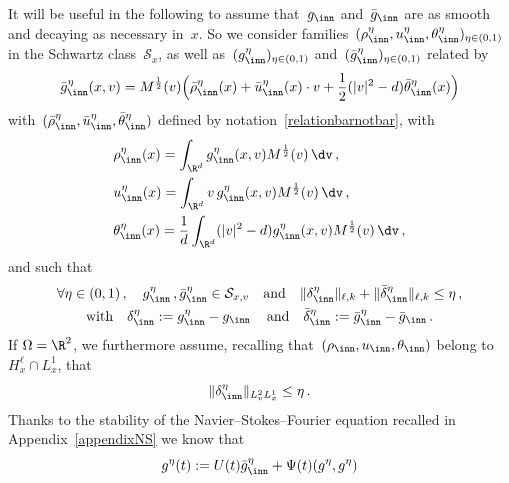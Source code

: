 It will be useful in the following to assume that~$ g_{\inn} $ and~$ \bar g_{\inn} $ are as smooth and decaying as necessary in~$x$. So we consider families~$ (\rho^\eta_{\inn}, u^\eta_{\inn},\theta^\eta_{\inn})_{\eta \in (0,1)} $ in the Schwartz class~$ {\mathcal S}_x$, as well as~$ (g^\eta_{\inn})_{\eta \in (0,1)} $ and~$ (\bar g^\eta_{\inn})_{\eta \in (0,1)} $ related by
\begin{equation}\label{bargeta}
\bar g^\eta_{\inn}(x,v)=M^\frac12(v)\Big(\bar \rho^\eta_{\inn} (x) + \bar u^\eta_{\inn}(x) \cdot v + \frac12(|v|^2- d) \bar \theta^\eta_{\inn} (x)\Big)
\end{equation}
with~$ (\bar \rho^\eta_{\inn}, \bar u^\eta_{\inn},\bar\theta^\eta_{\inn}) $ defined by notation~\eqref{relationbarnotbar}, with
\begin{equation}\label{bargetageta}
\begin{aligned}
&\rho^\eta_{\inn}(x)= \int_{\R^d} g^\eta_{\inn} (x,v)M^\frac12 (v) \, \dv \,, \\
&u^\eta_{\inn} (x)= \int_{\R^d} v\, g^\eta_{\inn} (x,v)M^\frac12 (v) \, \dv\,, \\
&\theta^\eta_{\inn} (x)= \frac{1}{d} \int_{\R^d} (|v|^2-d) g^\eta_{\inn} (x,v)M^\frac12 (v) \, \dv \,,
\end{aligned}
\end{equation}
and such that
\begin{equation}\label{deltaineta}
\begin{gathered}
\forall \eta \in (0,1) \,, \quad g^\eta_{\inn} \,, \bar g^\eta_{\inn} \in {\mathcal S}_{x,v} \quad \text{and} \quad \| \delta^\eta_{\inn} \|_{\ell,k} +\| \bar\delta^\eta_{\inn} \|_{\ell,k} \leq \eta \,, \\
\text{with} \quad \delta^\eta_{\inn} := g^\eta_{\inn} - g _{\inn}
\, \quad \text{and} \quad \bar \delta^\eta_{\inn} :=\bar g^\eta_{\inn} - \bar g _{\inn} \,.
\end{gathered}
\end{equation}
If $\Omega = \R^2$, we furthermore assume, recalling that~$(\rho_{\inn}, u_{\inn},\theta_{\inn})$ belong to~$H^\ell_x \cap L^1_x$, that
\begin{equation}\label{deltainetaR2}
\| \delta^\eta_{\inn} \|_{L^2_vL^1_x} \le \eta \,.
\end{equation}
Thanks to the stability of the Navier--Stokes--Fourier equation recalled in Appendix~\ref{appendixNS} we know that
\begin{equation}\label{eqgeta}
g^\eta(t) :=U (t)\bar g^\eta_{\inn} + \Psi(t) (g^\eta,g^\eta)
\end{equation}
